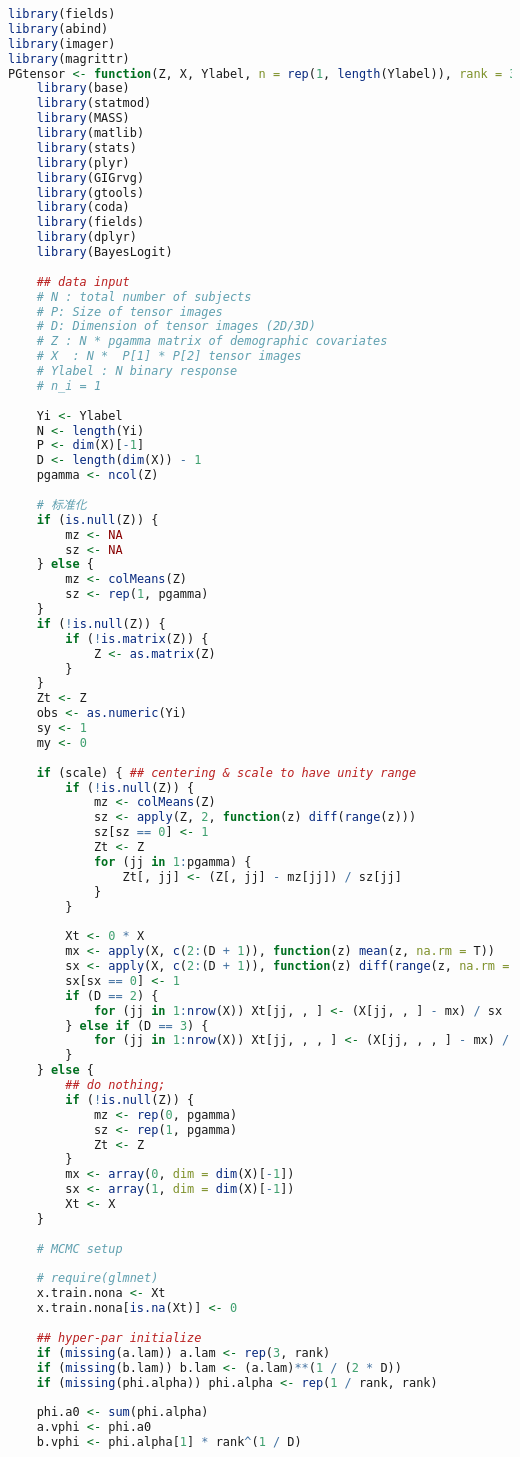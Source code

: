 \documentclass[AutoFakeBold]{LZUThesis}
\begin{document}
\begin{lstlisting}[language = R, caption = {BT-LR}算法]
library(fields)
library(abind)
library(imager)
library(magrittr)
PGtensor <- function(Z, X, Ylabel, n = rep(1, length(Ylabel)), rank = 3, nsweep = 1e3, nskip = 3, a.lam, b.lam, phi.alpha, scale = TRUE) {
	library(base)
	library(statmod)
	library(MASS)
	library(matlib)
	library(stats)
	library(plyr)
	library(GIGrvg)
	library(gtools)
	library(coda)
	library(fields)
	library(dplyr)
	library(BayesLogit)
	
	## data input
	# N : total number of subjects
	# P: Size of tensor images
	# D: Dimension of tensor images (2D/3D)
	# Z : N * pgamma matrix of demographic covariates
	# X  : N *  P[1] * P[2] tensor images
	# Ylabel : N binary response
	# n_i = 1
	
	Yi <- Ylabel
	N <- length(Yi)
	P <- dim(X)[-1]
	D <- length(dim(X)) - 1
	pgamma <- ncol(Z)
	
	# 标准化
	if (is.null(Z)) {
		mz <- NA
		sz <- NA
	} else {
		mz <- colMeans(Z)
		sz <- rep(1, pgamma)
	}
	if (!is.null(Z)) {
		if (!is.matrix(Z)) {
			Z <- as.matrix(Z)
		}
	}
	Zt <- Z
	obs <- as.numeric(Yi)
	sy <- 1
	my <- 0
	
	if (scale) { ## centering & scale to have unity range
		if (!is.null(Z)) {
			mz <- colMeans(Z)
			sz <- apply(Z, 2, function(z) diff(range(z)))
			sz[sz == 0] <- 1
			Zt <- Z
			for (jj in 1:pgamma) {
				Zt[, jj] <- (Z[, jj] - mz[jj]) / sz[jj]
			}
		}
		
		Xt <- 0 * X
		mx <- apply(X, c(2:(D + 1)), function(z) mean(z, na.rm = T))
		sx <- apply(X, c(2:(D + 1)), function(z) diff(range(z, na.rm = T)))
		sx[sx == 0] <- 1
		if (D == 2) {
			for (jj in 1:nrow(X)) Xt[jj, , ] <- (X[jj, , ] - mx) / sx
		} else if (D == 3) {
			for (jj in 1:nrow(X)) Xt[jj, , , ] <- (X[jj, , , ] - mx) / sx
		}
	} else {
		## do nothing;
		if (!is.null(Z)) {
			mz <- rep(0, pgamma)
			sz <- rep(1, pgamma)
			Zt <- Z
		}
		mx <- array(0, dim = dim(X)[-1])
		sx <- array(1, dim = dim(X)[-1])
		Xt <- X
	}
	
	# MCMC setup
	
	# require(glmnet)
	x.train.nona <- Xt
	x.train.nona[is.na(Xt)] <- 0
	
	## hyper-par initialize
	if (missing(a.lam)) a.lam <- rep(3, rank)
	if (missing(b.lam)) b.lam <- (a.lam)**(1 / (2 * D))
	if (missing(phi.alpha)) phi.alpha <- rep(1 / rank, rank)
	
	phi.a0 <- sum(phi.alpha)
	a.vphi <- phi.a0
	b.vphi <- phi.alpha[1] * rank^(1 / D)
	

\end{lstlisting}
\end{document}
